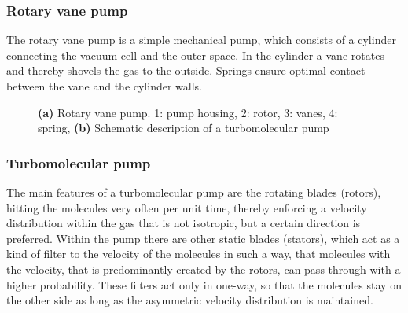 \documentclass[a4paper]{scrartcl}
\numberwithin{equation}{section}
\numberwithin{figure}{section}
\numberwithin{table}{section}
\begin{document}
\subsubsection{Rotary vane pump}
The rotary vane pump is a simple mechanical pump, which consists of a cylinder connecting the vacuum cell and the outer space. In the cylinder a vane rotates and thereby shovels the gas to the outside. Springs ensure optimal contact between the vane and the cylinder walls. 
\begin{figure} 
 \centering
{}
 \hfill
{}
\caption{
\small \textbf{(a)} Rotary vane pump. 1: pump housing, 2: rotor, 3: vanes, 4: spring,  \textbf{(b)} Schematic description of a turbomolecular pump } 
	\label{fig:pump}
\end{figure}


\subsubsection{Turbomolecular pump}
The main features of a turbomolecular pump are the rotating blades (rotors), hitting the molecules very often per unit time, thereby enforcing a velocity distribution within the gas that is not isotropic, but a certain direction is preferred. Within the pump there are other static blades (stators), which act as a kind of filter to the velocity of the molecules in such a way, that molecules with the velocity, that is predominantly created by the rotors, can pass through with a higher probability. These filters act only in one-way, so that the molecules stay on the other side as long as the asymmetric velocity distribution is maintained. 
\end{document}
